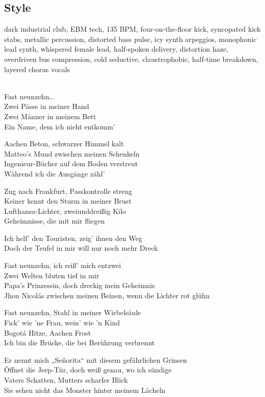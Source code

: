 \subsection{Style}
dark industrial club, EBM tech, 135 BPM, four-on-the-floor kick, syncopated kick stabs, metallic percussion, distorted bass pulse, icy synth arpeggios, monophonic lead synth, whispered female lead, half-spoken delivery, distortion haze, overdriven bus compression, cold seductive, claustrophobic, half-time breakdown, layered chorus vocals

\begin{lyrics}

\\
Fast neunzehn…\\
Zwei Pässe in meiner Hand\\
Zwei Männer in meinem Bett\\
Ein Name, dem ich nicht entkomm’

Aachen Beton, schwarzer Himmel kalt\\
Matteo’s Mund zwischen meinen Schenkeln\\
Ingenieur-Bücher auf dem Boden verstreut\\
Während ich die Ausgänge zähl’

Zug nach Frankfurt, Passkontrolle streng\\
Keiner kennt den Sturm in meiner Brust\\
Lufthansa-Lichter, zweiunddreißig Kilo\\
Geheimnisse, die mit mir fliegen

Ich helf’ den Touristen, zeig’ ihnen den Weg\\
Doch der Teufel in mir will nur noch mehr Dreck

Fast neunzehn, ich reiß’ mich entzwei\\
Zwei Welten bluten tief in mir\\
Papa’s Prinzessin, doch dreckig mein Geheimnis\\
Jhon Nicolás zwischen meinen Beinen, wenn die Lichter rot glühn

Fast neunzehn, Stahl in meiner Wirbelsäule\\
Fick’ wie ’ne Frau, wein’ wie ’n Kind\\
Bogotá Hitze, Aachen Frost\\
Ich bin die Brücke, die bei Berührung verbrennt

Er nennt mich „Señorita“ mit diesem gefährlichen Grinsen\\
Öffnet die Jeep-Tür, doch weiß genau, wo ich sündige\\
Vaters Schatten, Mutters scharfer Blick\\
Sie sehen nicht das Monster hinter meinem Lächeln


\end{lyrics}
